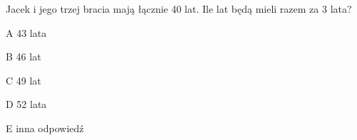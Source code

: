 \begin{tresc}
Jacek i jego trzej bracia mają łącznie 40 lat. Ile lat będą mieli razem za 3 lata?
\end{tresc}
\begin{wariant}{A} 43 lata \end{wariant}
\begin{wariant}{B} 46 lat \end{wariant}
\begin{wariant}{C} 49 lat \end{wariant}
\begin{wariant}{D} 52 lata \end{wariant}
\begin{wariant}{E} inna odpowiedź \end{wariant}

